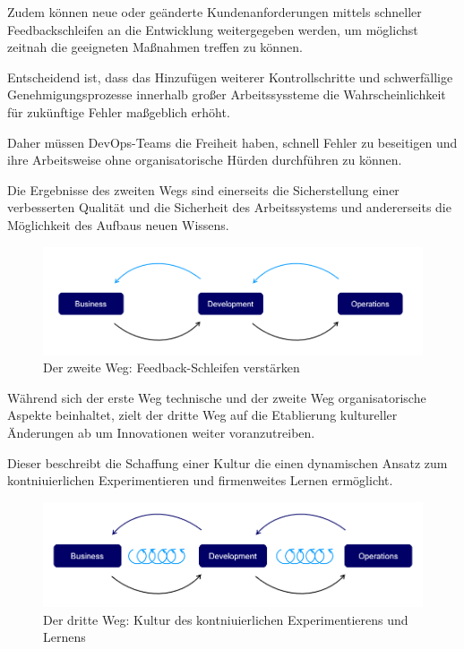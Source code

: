 Zudem können neue oder geänderte Kundenanforderungen mittels schneller Feedbackschleifen an die Entwicklung weitergegeben werden, um möglichst zeitnah die geeigneten Maßnahmen treffen zu können.

Entscheidend ist, dass das Hinzufügen weiterer Kontrollschritte und schwerfällige Genehmigungsprozesse innerhalb großer Arbeitssyssteme die Wahrscheinlichkeit für zukünftige Fehler maßgeblich erhöht. \cite[S. 31]{kim_devops-handbuch_2017} 

Daher müssen DevOps-Teams die Freiheit haben, schnell Fehler zu beseitigen und ihre Arbeitsweise ohne organisatorische Hürden durchführen zu können.   

Die Ergebnisse des zweiten Wegs sind einerseits die Sicherstellung einer verbesserten Qualität und die Sicherheit des Arbeitssystems und andererseits die Möglichkeit des Aufbaus neuen Wissens.

\begin{figure}[h]
    \centering
    \includegraphics[scale=0.6]{Bilder/Second Way.png}
    \caption{Der zweite Weg: Feedback-Schleifen verstärken \cite{kim_three_2012}}
\end{figure}

Während sich der erste Weg technische und der zweite Weg organisatorische Aspekte beinhaltet, zielt der dritte Weg auf die Etablierung kultureller Änderungen ab um Innovationen weiter voranzutreiben. 

Dieser beschreibt die Schaffung einer Kultur die einen dynamischen Ansatz zum kontniuierlichen Experimentieren und firmenweites Lernen ermöglicht. 

\begin{figure}[h]
    \centering
    \includegraphics[scale=0.6]{Bilder/Third Way.png}
    \caption{Der dritte Weg: Kultur des kontniuierlichen Experimentierens und Lernens \cite{kim_three_2012}}
\end{figure}

